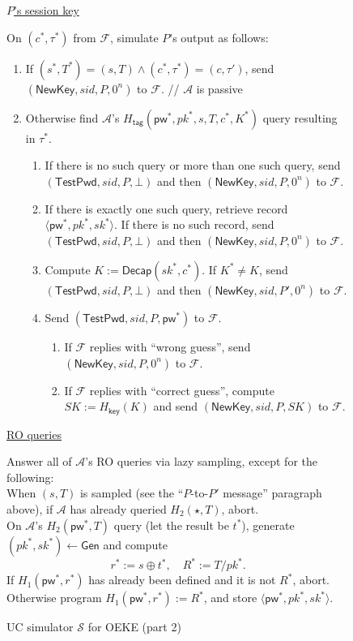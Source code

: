 \documentclass{article}
\theoremstyle{plain}
\theoremstyle{definition}
\theoremstyle{remark}
\newcommand{\adv}{\mathcal{A}}
\renewcommand{\sim}{\mathcal{S}}
\newcommand{\func}{\mathcal{F}}
\newcommand{\Gen}{\mathsf{Gen}}
\newcommand{\Decap}{\mathsf{Decap}}
\newcommand{\Hkey}{H_\mathsf{key}}
\newcommand{\Htag}{H_\mathsf{tag}}
\newcommand{\pw}{\mathsf{pw}}
\newcommand{\TestPwd}{\mathsf{TestPwd}}
\newcommand{\NewKey}{\mathsf{NewKey}}
\begin{document}
\begin{figure}[H]
\begin{framed}
\begin{small}
\underline{$P$'s session key}

\medskip
On $(c^*,\tau^*)$ from $\func$, simulate $P$'s output as follows:
\begin{enumerate}
  \item If $(s^*,T^*) = (s,T) \land (c^*,\tau^*) = (c,\tau')$, send $(\NewKey, sid, P, 0^n)$ to $\func$. \quad \textcolor[gray]{0.5}{// $\adv$ is passive}
  \item Otherwise find $\adv$'s $\Htag(\pw^*,pk^*,s,T,c^*,K^*)$ query resulting in $\tau^*$.
      \begin{enumerate}
        \item If there is no such query or more than one such query, send $(\TestPwd, sid, P, \bot)$ and then $(\NewKey, sid, P, 0^n)$ to $\func$.
        \item If there is exactly one such query, retrieve record $\langle\pw^*,pk^*,sk^*\rangle$. If there is no such record, send $(\TestPwd, sid, P, \bot)$ and then $(\NewKey, sid, P, 0^n)$ to $\func$.
        \item Compute $K := \Decap(sk^*,c^*)$. If $K^* \neq K$, send $(\TestPwd, sid, P, \bot)$ and then $(\NewKey, sid, P', 0^n)$ to $\func$.
        \item Send $(\TestPwd, sid, P, \pw^*)$ to $\func$.
            \begin{enumerate}
              \item If $\func$ replies with ``wrong guess'', send $(\NewKey, sid, P, 0^n)$ to $\func$.
              \item If $\func$ replies with ``correct guess'', compute $SK := \Hkey(K)$ and send $(\NewKey, sid, P, SK)$ to $\func$.
            \end{enumerate}
      \end{enumerate}
\end{enumerate}
\underline{RO queries}

\medskip
Answer all of $\adv$'s RO queries via lazy sampling, except for the following: \\
When $(s,T)$ is sampled (see the ``$P$-to-$P'$ message'' paragraph above), if $\adv$ has already queried $H_2(\star,T)$, abort. \\
On $\adv$'s $H_2(\pw^*,T)$ query (let the result be $t^*$), generate $(pk^*,sk^*) \gets \Gen$ and compute
\[
r^* := s \oplus t^*, \quad R^* := T/pk^*.
\]
If $H_1(\pw^*,r^*)$ has already been defined and it is not $R^*$, abort. Otherwise program $H_1(\pw^*,r^*) := R^*$, and store $\langle\pw^*,pk^*,sk^*\rangle$.
\end{small}
\end{framed}
\caption{UC simulator $\sim$ for OEKE (part 2)}
\label{fig:oeke-sim2}
\end{figure}
\end{document}
